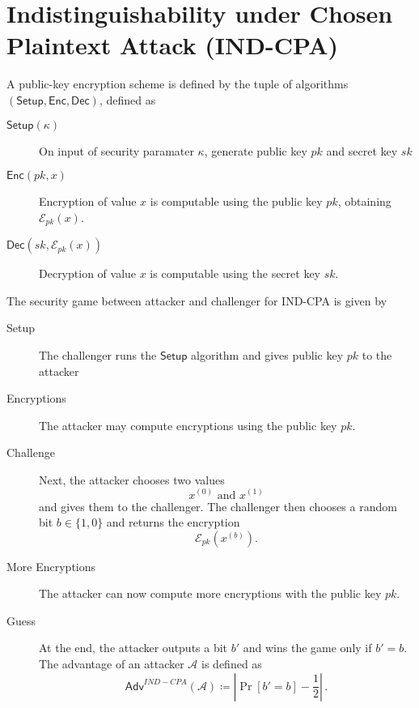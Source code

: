 \documentclass[twocolumn]{autart}
\begin{document}
\section{Indistinguishability under Chosen Plaintext Attack (IND-CPA)} \label{app:ind_cpa}
A public-key encryption scheme is defined by the tuple of algorithms $(\mathsf{Setup}, \mathsf{Enc}, \mathsf{Dec})$, defined as
\begin{description}
    \item[$\mathsf{Setup}(\kappa)$] On input of security paramater $\kappa$, generate public key $pk$ and secret key $sk$
    \item[$\mathsf{Enc}(pk, x)$] Encryption of value $x$ is computable using the public key $pk$, obtaining $\mathcal{E}_{pk}(x)$.
    \item[$\mathsf{Dec}(sk, \mathcal{E}_{pk}(x))$] Decryption of value $x$ is computable using the secret key $sk$.
\end{description}

The security game between attacker and challenger for IND-CPA is given by
\begin{description}
    \item[Setup] The challenger runs the $\mathsf{Setup}$ algorithm and gives public key $pk$ to the attacker
    \item[Encryptions] The attacker may compute encryptions using the public key $pk$.
    \item[Challenge] Next, the attacker chooses two values
    \begin{equation*}
        x^{(0)} \text{ and } x^{(1)}
    \end{equation*}
    and gives them to the challenger. The challenger then chooses a random bit $b \in \{1,0\}$ and returns the encryption
    \begin{equation*}
        \mathcal{E}_{pk}(x^{(b)}).
    \end{equation*}
    \item[More Encryptions] The attacker can now compute more encryptions with the public key $pk$.
    \item[Guess] At the end, the attacker outputs a bit $b'$ and wins the game only if $b' = b$. The advantage of an attacker $\mathcal{A}$ is defined as
    \begin{equation*}
        \mathsf{Adv}^{IND-CPA}(\mathcal{A}) \coloneqq \left\lvert \Pr [b'=b] - \frac{1}{2}\right\rvert\,.
    \end{equation*} 
\end{description}
\end{document}
